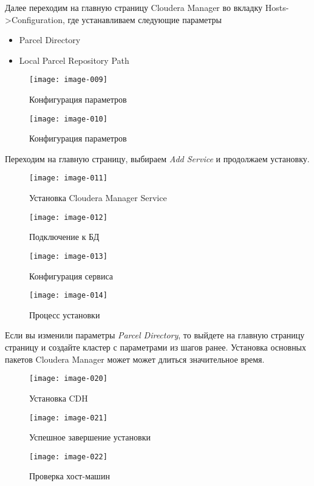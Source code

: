 Далее переходим на главную страницу Cloudera Manager во вкладку Hosts->Configuration, где 
устанавливаем следующие параметры
\begin{itemize}
    \item Parcel Directory
    \item Local Parcel Repository Path
\end{itemize}

\begin{figure}[ht!]
    \center
    \texttt{[image: image-009]}
    \caption{Конфигурация параметров}
    \texttt{[image: image-010]}
    \caption{Конфигурация параметров}
\end{figure}
Переходим на главную страницу, выбираем \emph{Add Service} и продолжаем установку.

\newpage

\begin{figure}[ht!]
    \center
    \texttt{[image: image-011]}
    \caption{Установка Cloudera Manager Service}
    \texttt{[image: image-012]}
    \caption{Подключение к БД}
\end{figure}

\newpage

\begin{figure}[ht!]
    \center
    \texttt{[image: image-013]}
    \caption{Конфигурация сервиса}
    \texttt{[image: image-014]}
    \caption{Процесс установки}
\end{figure}

Если вы изменили параметры \emph{Parcel Directory}, то выйдете на главную страницу страницу и создайте 
кластер с параметрами из шагов ранее. Установка основных пакетов Cloudera Manager может может длиться 
значительное время.

\begin{figure}[ht!]
    \center
    \texttt{[image: image-020]}
    \caption{Установка CDH}
\end{figure}

\newpage

\begin{figure}[ht!]
    \center
    \texttt{[image: image-021]}
    \caption{Успешное завершение установки}
    \texttt{[image: image-022]}
    \caption{Проверка хост-машин}
\end{figure}

\newpage

